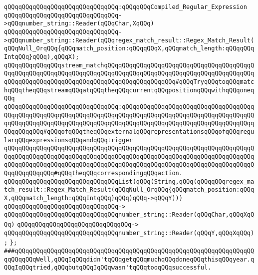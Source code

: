 \verb|qQQqqQQqqQQqqQQqqQQqqQQqqQQqqQQq:qQQqqQQqCompiled_Regular_Expression|\newline
\verb|qQQqqQQqqQQqqQQqqQQqqQQqqQQqqQQq->qQQqnumber_string::Reader(qQQqChar,XqQQq)|\newline
\verb|qQQqqQQqqQQqqQQqqQQqqQQqqQQqqQQq->qQQqnumber_string::Reader(qQQqregex_match_result::Regex_Match_Result(qQQqNull_OrqQQq{qQQqmatch_position:qQQqqQQqX,qQQqmatch_length:qQQqqQQqIntqQQq}qQQq),qQQqX);|\newline
\newline
\newline
\verb|qQQqqQQqqQQqqQQqstream_matchqQQqqQQqqQQqqQQqqQQqqQQqqQQqqQQqqQQqqQQqqQQqqQQqqQQqqQQqqQQqqQQqqQQqqQQqqQQqqQQqqQQqqQQqqQQqqQQqqQQqqQQqqQQqqQQqqQQqqQQqqQQqqQQqqQQqqQQqqQQqqQQqqQQqqQQqqQQqqQQq#qQQqTryqQQqtoqQQqmatchqQQqtheqQQqstreamqQQqatqQQqtheqQQqcurrentqQQqpositionqQQqwithqQQqoneqQQq|\newline
\verb|qQQqqQQqqQQqqQQqqQQqqQQqqQQqqQQq:qQQqqQQqqQQqqQQqqQQqqQQqqQQqqQQqqQQqqQQqqQQqqQQqqQQqqQQqqQQqqQQqqQQqqQQqqQQqqQQqqQQqqQQqqQQqqQQqqQQqqQQqqQQqqQQqqQQqqQQqqQQqqQQqqQQqqQQqqQQqqQQqqQQqqQQqqQQqqQQqqQQqqQQqqQQqqQQqqQQqqQQqqQQq#qQQqofqQQqtheqQQqexternalqQQqrepresentationsqQQqofqQQqregularqQQqexpressionsqQQqandqQQqtrigger|\newline
\verb|qQQqqQQqqQQqqQQqqQQqqQQqqQQqqQQqqQQqqQQqqQQqqQQqqQQqqQQqqQQqqQQqqQQqqQQqqQQqqQQqqQQqqQQqqQQqqQQqqQQqqQQqqQQqqQQqqQQqqQQqqQQqqQQqqQQqqQQqqQQqqQQqqQQqqQQqqQQqqQQqqQQqqQQqqQQqqQQqqQQqqQQqqQQqqQQqqQQqqQQqqQQqqQQqqQQqqQQqqQQqqQQq#qQQqtheqQQqcorrespondingqQQqaction.|\newline
\verb|qQQqqQQqqQQqqQQqqQQqqQQqqQQqqQQqList(qQQq(String,qQQq(qQQqqQQqregex_match_result::Regex_Match_Result(qQQqNull_OrqQQq{qQQqmatch_position:qQQqX,qQQqmatch_length:qQQqIntqQQq}qQQq)qQQq->qQQqY)))|\newline
\verb|qQQqqQQqqQQqqQQqqQQqqQQqqQQqqQQq->|\newline
\verb|qQQqqQQqqQQqqQQqqQQqqQQqqQQqqQQqnumber_string::Reader(qQQqChar,qQQqXqQQq)|\newline
\verb|qQQqqQQqqQQqqQQqqQQqqQQqqQQqqQQq->|\newline
\verb|qQQqqQQqqQQqqQQqqQQqqQQqqQQqqQQqnumber_string::Reader(qQQqY,qQQqXqQQq);|\newline
\verb|};|\newline
\newline
\newline
\verb|###qQQqqQQqqQQqqQQqqQQqqQQqqQQqqQQqqQQqqQQqqQQqqQQqqQQqqQQqqQQqqQQqqQQqqQQqqQQqWell,qQQqIqQQqdidn'tqQQqgetqQQqmuchqQQqdoneqQQqthisqQQqyear.qQQqIqQQqtried,qQQqbutqQQqIqQQqwasn'tqQQqtooqQQqsuccessful.|\newline
